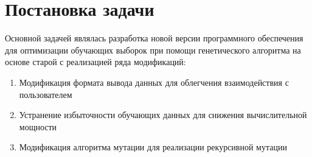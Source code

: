 \documentclass[utf8,usehyperref,12pt]{G7-32}
\begin{document}
\chapter{Постановка задачи}
Основной задачей являлась разработка новой версии программного обеспечения для оптимизации обучающих выборок при помощи генетического алгоритма на основе старой с реализацией ряда модификаций:
\begin{enumerate}
\item Модификация формата вывода данных для облегчения взаимодействия с пользователем
\item Устранение избыточности обучающих данных для снижения вычислительной мощности
\item Модификация алгоритма мутации для реализации рекурсивной мутации 
\end{enumerate}	
\end{document}
